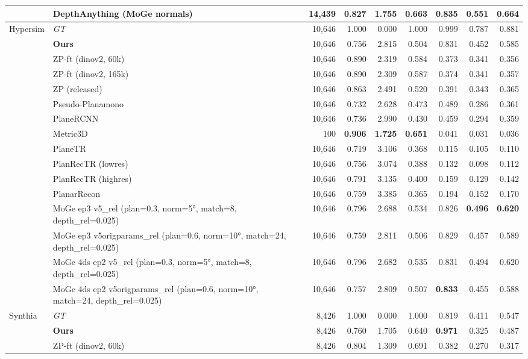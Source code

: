 \begin{table}[t]
\begin{tabular}{l l r r r r r r r}
 & DepthAnything (MoGe normals) & 14,439 & 0.827 & 1.755 & 0.663 & 0.835 & 0.551 & 0.664 \\
\midrule
Hypersim & \textit{GT} & 10,646 & 1.000 & 0.000 & 1.000 & 0.999 & 0.787 & 0.881 \\
 & \textbf{Ours} & 10,646 & 0.756 & 2.815 & 0.504 & 0.831 & 0.452 & 0.585 \\
 & ZP-ft (dinov2, 60k) & 10,646 & 0.890 & 2.319 & 0.584 & 0.373 & 0.341 & 0.356 \\
 & ZP-ft (dinov2, 165k) & 10,646 & 0.890 & 2.309 & 0.587 & 0.374 & 0.341 & 0.357 \\
 & ZP (released) & 10,646 & 0.863 & 2.491 & 0.520 & 0.391 & 0.343 & 0.365 \\
 & Pseudo-Planamono & 10,646 & 0.732 & 2.628 & 0.473 & 0.489 & 0.286 & 0.361 \\
 & PlaneRCNN & 10,646 & 0.736 & 2.990 & 0.430 & 0.459 & 0.294 & 0.359 \\
 & Metric3D & 100 & \textbf{0.906} & \textbf{1.725} & \textbf{0.651} & 0.041 & 0.031 & 0.036 \\
 & PlaneTR & 10,646 & 0.719 & 3.106 & 0.368 & 0.115 & 0.105 & 0.110 \\
 & PlanRecTR (lowres) & 10,646 & 0.756 & 3.074 & 0.388 & 0.132 & 0.098 & 0.112 \\
 & PlanRecTR (highres) & 10,646 & 0.791 & 3.135 & 0.400 & 0.159 & 0.129 & 0.142 \\
 & PlanarRecon & 10,646 & 0.759 & 3.385 & 0.365 & 0.194 & 0.152 & 0.170 \\
 & MoGe ep3 v5\_rel (plan=0.3, norm=5°, match=8, depth\_rel=0.025) & 10,646 & 0.796 & 2.688 & 0.534 & 0.826 & \textbf{0.496} & \textbf{0.620} \\
 & MoGe ep3 v5origparams\_rel (plan=0.6, norm=10°, match=24, depth\_rel=0.025) & 10,646 & 0.759 & 2.811 & 0.506 & 0.829 & 0.457 & 0.589 \\
 & MoGe 4ds ep2 v5\_rel (plan=0.3, norm=5°, match=8, depth\_rel=0.025) & 10,646 & 0.796 & 2.682 & 0.535 & 0.831 & 0.494 & 0.620 \\
 & MoGe 4ds ep2 v5origparams\_rel (plan=0.6, norm=10°, match=24, depth\_rel=0.025) & 10,646 & 0.757 & 2.809 & 0.507 & \textbf{0.833} & 0.455 & 0.588 \\
\midrule
Synthia & \textit{GT} & 8,426 & 1.000 & 0.000 & 1.000 & 0.819 & 0.411 & 0.547 \\
 & \textbf{Ours} & 8,426 & 0.760 & 1.705 & 0.640 & \textbf{0.971} & 0.325 & 0.487 \\
 & ZP-ft (dinov2, 60k) & 8,426 & 0.804 & 1.309 & 0.691 & 0.382 & 0.270 & 0.317 \\

\end{tabular}
\end{table}
